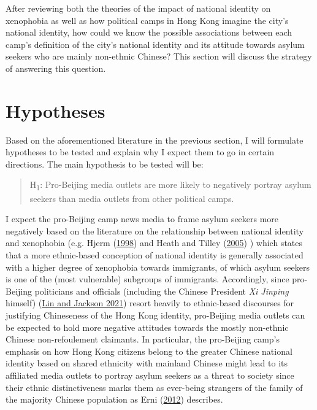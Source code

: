 \documentclass[a4paper, oneside]{report}
\begin{document}
After reviewing both the theories of the impact of national identity on
xenophobia as well as how political camps in Hong Kong imagine the
city's national identity, how could we know the possible associations
between each camp's definition of the city's national identity and its
attitude towards asylum seekers who are mainly non-ethnic Chinese? This
section will discuss the strategy of answering this question.

\hypertarget{hypotheses}{%
\section{Hypotheses}\label{hypotheses}}

Based on the aforementioned literature in the previous section, I will
formulate hypotheses to be tested and explain why I expect them to go in
certain directions. The main hypothesis to be tested will be:

\begin{quote}
H\textsubscript{1}: Pro-Beijing media outlets are more likely to
negatively portray asylum seekers than media outlets from other
political camps.
\end{quote}

I expect the pro-Beijing camp news media to frame asylum seekers more
negatively based on the literature on the relationship between national
identity and xenophobia (e.g. Hjerm
(\protect\hyperlink{ref-hjermNationalIdentityComparison1998}{1998}) and
Heath and Tilley
(\protect\hyperlink{ref-heathBritishNationalIdentity2005}{2005}) ) which
states that a more ethnic-based conception of national identity is
generally associated with a higher degree of xenophobia towards
immigrants, of which asylum seekers is one of the (most vulnerable)
subgroups of immigrants. Accordingly, since pro-Beijing politicians and
officials (including the Chinese President \emph{Xi Jinping} himself)
(\protect\hyperlink{ref-linMakeChinaGreat2021}{Lin and Jackson 2021})
resort heavily to ethnic-based discourses for justifying Chineseness of
the Hong Kong identity, pro-Beijing media outlets can be expected to
hold more negative attitudes towards the mostly non-ethnic Chinese
non-refoulement claimants. In particular, the pro-Beijing camp's
emphasis on how Hong Kong citizens belong to the greater Chinese
national identity based on shared ethnicity with mainland Chinese might
lead to its affiliated media outlets to portray asylum seekers as a
threat to society since their ethnic distinctiveness marks them as
ever-being strangers of the family of the majority Chinese population as
Erni (\protect\hyperlink{ref-erniWhoNeedsStrangers2012}{2012})
describes.
\end{document}
